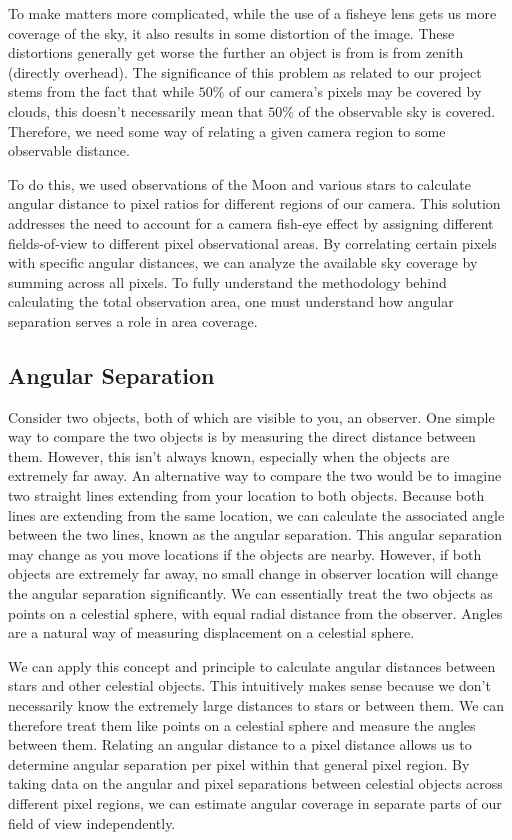 To make matters more complicated, while the use of a fisheye lens gets us more coverage of the sky, it also results in some distortion of the image.
These distortions generally get worse the further an object is from is from zenith (directly overhead).
The significance of this problem as related to our project stems from the fact that while $50\% $ of our camera's pixels may be covered by clouds, this doesn't necessarily mean that $50\%$ of the observable sky is covered.
Therefore, we need some way of relating a given camera region to some observable distance.

To do this, we used observations of the Moon and various stars to calculate angular distance to pixel ratios for different regions of our camera.
This solution addresses the need to account for a camera fish-eye effect by assigning different fields-of-view to different pixel observational areas.
By correlating certain pixels with specific angular distances, we can analyze the available sky coverage by summing across all pixels.
To fully understand the methodology behind calculating the total observation area, one must understand how angular separation serves a role in area coverage.

\subsection{Angular Separation}

Consider two objects, both of which are visible to you, an observer.
One simple way to compare the two objects is by measuring the direct distance between them.
However, this isn't always known, especially when the objects are extremely far away.
An alternative way to compare the two would be to imagine two straight lines extending from your location to both objects.  
Because both lines are extending from the same location, we can calculate the associated angle between the two lines, known as the angular separation.
This angular separation may change as you move locations if the objects are nearby. However, if both objects are extremely far away, no small change in observer location will change the angular separation significantly.
We can essentially treat the two objects as points on a celestial sphere, with equal radial distance from the observer.  
Angles are a natural way of measuring displacement on a celestial sphere.


We can apply this concept and principle to calculate angular distances between stars and other celestial objects.
This intuitively makes sense because we don't necessarily know the extremely large distances to stars or between them.
We can therefore treat them like points on a celestial sphere and measure the angles between them.
Relating an angular distance to a pixel distance allows us to determine angular separation per pixel within that general pixel region.
By taking data on the angular and pixel separations between celestial objects across different pixel regions, we can estimate angular coverage in separate parts of our field of view independently.

